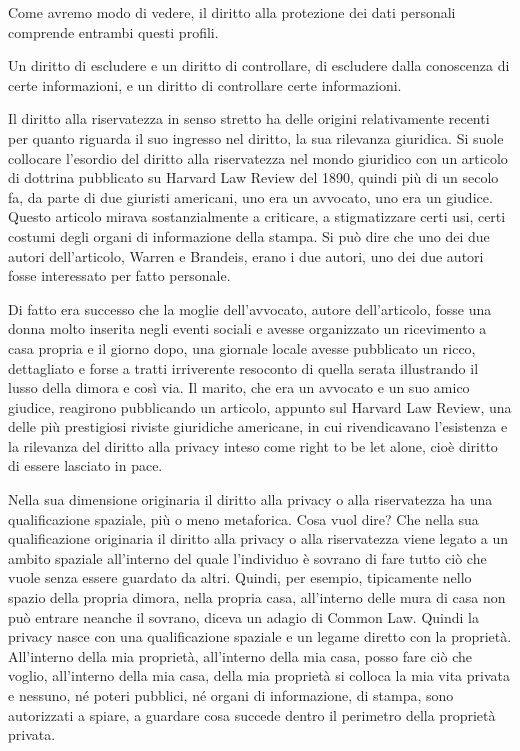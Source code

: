 Come avremo modo di vedere, il diritto alla protezione dei dati personali comprende entrambi questi profili. 

Un diritto di escludere e un diritto di controllare, di escludere dalla conoscenza di certe informazioni, e un diritto di controllare certe informazioni. 

Il diritto alla riservatezza in senso stretto ha delle origini relativamente recenti per quanto riguarda il suo ingresso nel diritto, la sua rilevanza giuridica. Si suole collocare l'esordio del diritto alla riservatezza nel mondo giuridico con un articolo di dottrina pubblicato su Harvard Law Review del 1890, quindi più di un secolo fa, da parte di due giuristi americani, uno era un avvocato, uno era un giudice. 
Questo articolo mirava sostanzialmente a criticare, a stigmatizzare certi usi, certi costumi degli organi di informazione della stampa. Si può dire che uno dei due autori dell'articolo, Warren e Brandeis, erano i due autori, uno dei due autori fosse interessato per fatto personale. 

Di fatto era successo che la moglie dell'avvocato, autore dell'articolo, fosse una donna molto inserita negli eventi sociali e avesse organizzato un ricevimento a casa propria e il giorno dopo, una giornale locale avesse pubblicato un ricco, dettagliato e forse a tratti irriverente resoconto di quella serata illustrando il lusso della dimora e così via. Il marito, che era un avvocato e un suo amico giudice, reagirono pubblicando un articolo, appunto sul Harvard Law Review, una delle più prestigiosi riviste giuridiche americane, in cui rivendicavano l'esistenza  e la rilevanza del diritto alla privacy inteso come right to be let alone, cioè diritto di essere lasciato in pace. 

Nella sua dimensione originaria il diritto alla privacy o alla riservatezza ha una qualificazione spaziale, più o meno metaforica. Cosa vuol dire? Che nella sua qualificazione originaria il diritto alla privacy o alla riservatezza viene legato a un ambito spaziale all'interno del quale l'individuo è sovrano di fare tutto ciò che vuole senza essere guardato da altri. 
Quindi, per esempio, tipicamente nello spazio della propria dimora, nella propria casa, all'interno delle mura di casa non può entrare neanche il sovrano, diceva un adagio di Common Law. Quindi la privacy nasce con una qualificazione spaziale e un legame diretto con la proprietà. All'interno della mia proprietà, all'interno della mia casa, posso fare ciò che voglio, all'interno della mia casa, della mia proprietà si colloca la mia vita privata e nessuno, né poteri pubblici, né organi di informazione, di stampa, sono autorizzati a spiare, a guardare cosa succede dentro il perimetro della proprietà privata. 

